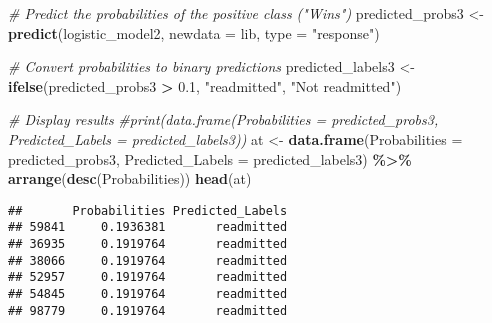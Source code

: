 \documentclass[
]{article}
\newenvironment{Shaded}{\begin{snugshade}}{\end{snugshade}}
\newcommand{\AttributeTok}[1]{\textcolor[rgb]{0.13,0.29,0.53}{#1}}
\newcommand{\CommentTok}[1]{\textcolor[rgb]{0.56,0.35,0.01}{\textit{#1}}}
\newcommand{\FloatTok}[1]{\textcolor[rgb]{0.00,0.00,0.81}{#1}}
\newcommand{\FunctionTok}[1]{\textcolor[rgb]{0.13,0.29,0.53}{\textbf{#1}}}
\newcommand{\NormalTok}[1]{#1}
\newcommand{\OtherTok}[1]{\textcolor[rgb]{0.56,0.35,0.01}{#1}}
\newcommand{\SpecialCharTok}[1]{\textcolor[rgb]{0.81,0.36,0.00}{\textbf{#1}}}
\newcommand{\StringTok}[1]{\textcolor[rgb]{0.31,0.60,0.02}{#1}}
\begin{document}
\begin{Shaded}
\begin{Highlighting}[]
\CommentTok{\# Predict the probabilities of the positive class ("Wins")}
\NormalTok{predicted\_probs3 }\OtherTok{\textless{}{-}} \FunctionTok{predict}\NormalTok{(logistic\_model2, }\AttributeTok{newdata =}\NormalTok{ lib, }\AttributeTok{type =} \StringTok{"response"}\NormalTok{)}


\CommentTok{\# Convert probabilities to binary predictions}
\NormalTok{predicted\_labels3 }\OtherTok{\textless{}{-}} \FunctionTok{ifelse}\NormalTok{(predicted\_probs3 }\SpecialCharTok{\textgreater{}} \FloatTok{0.1}\NormalTok{, }\StringTok{"readmitted"}\NormalTok{, }\StringTok{"Not readmitted"}\NormalTok{)}

\CommentTok{\# Display results}
\CommentTok{\#print(data.frame(Probabilities = predicted\_probs3, Predicted\_Labels = predicted\_labels3))}
\NormalTok{at }\OtherTok{\textless{}{-}} \FunctionTok{data.frame}\NormalTok{(}\AttributeTok{Probabilities =}\NormalTok{ predicted\_probs3, }\AttributeTok{Predicted\_Labels =}\NormalTok{ predicted\_labels3) }\SpecialCharTok{\%\textgreater{}\%} \FunctionTok{arrange}\NormalTok{(}\FunctionTok{desc}\NormalTok{(Probabilities))}
\FunctionTok{head}\NormalTok{(at)}
\end{Highlighting}
\end{Shaded}

\begin{verbatim}
##       Probabilities Predicted_Labels
## 59841     0.1936381       readmitted
## 36935     0.1919764       readmitted
## 38066     0.1919764       readmitted
## 52957     0.1919764       readmitted
## 54845     0.1919764       readmitted
## 98779     0.1919764       readmitted
\end{verbatim}

\begin{Shaded}
\end{Shaded}
\end{document}

